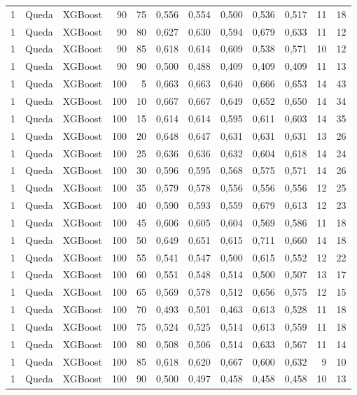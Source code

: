\begin{longtable}{@{}rllrrrrrrrrr@{}}
1 & Queda & XGBoost & 90 & 75 & 0,556 & 0,554 & 0,500 & 0,536 & 0,517 & 11 & 18 \\
1 & Queda & XGBoost & 90 & 80 & 0,627 & 0,630 & 0,594 & 0,679 & 0,633 & 11 & 12 \\
1 & Queda & XGBoost & 90 & 85 & 0,618 & 0,614 & 0,609 & 0,538 & 0,571 & 10 & 12 \\
1 & Queda & XGBoost & 90 & 90 & 0,500 & 0,488 & 0,409 & 0,409 & 0,409 & 11 & 13 \\
1 & Queda & XGBoost & 100 & 5 & 0,663 & 0,663 & 0,640 & 0,666 & 0,653 & 14 & 43 \\
1 & Queda & XGBoost & 100 & 10 & 0,667 & 0,667 & 0,649 & 0,652 & 0,650 & 14 & 34 \\
1 & Queda & XGBoost & 100 & 15 & 0,614 & 0,614 & 0,595 & 0,611 & 0,603 & 14 & 35 \\
1 & Queda & XGBoost & 100 & 20 & 0,648 & 0,647 & 0,631 & 0,631 & 0,631 & 13 & 26 \\
1 & Queda & XGBoost & 100 & 25 & 0,636 & 0,636 & 0,632 & 0,604 & 0,618 & 14 & 24 \\
1 & Queda & XGBoost & 100 & 30 & 0,596 & 0,595 & 0,568 & 0,575 & 0,571 & 14 & 26 \\
1 & Queda & XGBoost & 100 & 35 & 0,579 & 0,578 & 0,556 & 0,556 & 0,556 & 12 & 25 \\
1 & Queda & XGBoost & 100 & 40 & 0,590 & 0,593 & 0,559 & 0,679 & 0,613 & 12 & 23 \\
1 & Queda & XGBoost & 100 & 45 & 0,606 & 0,605 & 0,604 & 0,569 & 0,586 & 11 & 18 \\
1 & Queda & XGBoost & 100 & 50 & 0,649 & 0,651 & 0,615 & 0,711 & 0,660 & 14 & 18 \\
1 & Queda & XGBoost & 100 & 55 & 0,541 & 0,547 & 0,500 & 0,615 & 0,552 & 12 & 22 \\
1 & Queda & XGBoost & 100 & 60 & 0,551 & 0,548 & 0,514 & 0,500 & 0,507 & 13 & 17 \\
1 & Queda & XGBoost & 100 & 65 & 0,569 & 0,578 & 0,512 & 0,656 & 0,575 & 12 & 15 \\
1 & Queda & XGBoost & 100 & 70 & 0,493 & 0,501 & 0,463 & 0,613 & 0,528 & 11 & 18 \\
1 & Queda & XGBoost & 100 & 75 & 0,524 & 0,525 & 0,514 & 0,613 & 0,559 & 11 & 18 \\
1 & Queda & XGBoost & 100 & 80 & 0,508 & 0,506 & 0,514 & 0,633 & 0,567 & 11 & 14 \\
1 & Queda & XGBoost & 100 & 85 & 0,618 & 0,620 & 0,667 & 0,600 & 0,632 & 9 & 10 \\
1 & Queda & XGBoost & 100 & 90 & 0,500 & 0,497 & 0,458 & 0,458 & 0,458 & 10 & 13 \\

\end{longtable}
